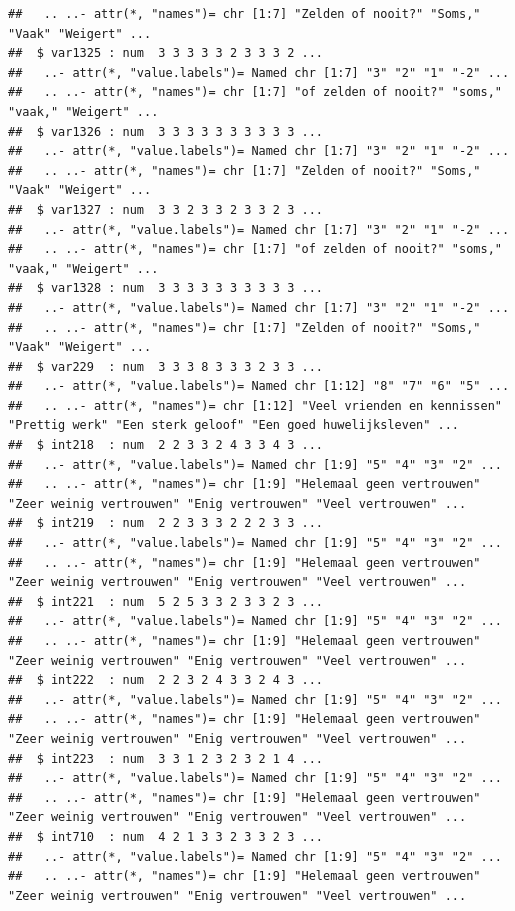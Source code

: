 \documentclass[
]{book}
\begin{document}
\begin{verbatim}
##   .. ..- attr(*, "names")= chr [1:7] "Zelden of nooit?" "Soms," "Vaak" "Weigert" ...
##  $ var1325 : num  3 3 3 3 3 2 3 3 3 2 ...
##   ..- attr(*, "value.labels")= Named chr [1:7] "3" "2" "1" "-2" ...
##   .. ..- attr(*, "names")= chr [1:7] "of zelden of nooit?" "soms," "vaak," "Weigert" ...
##  $ var1326 : num  3 3 3 3 3 3 3 3 3 3 ...
##   ..- attr(*, "value.labels")= Named chr [1:7] "3" "2" "1" "-2" ...
##   .. ..- attr(*, "names")= chr [1:7] "Zelden of nooit?" "Soms," "Vaak" "Weigert" ...
##  $ var1327 : num  3 3 2 3 3 2 3 3 2 3 ...
##   ..- attr(*, "value.labels")= Named chr [1:7] "3" "2" "1" "-2" ...
##   .. ..- attr(*, "names")= chr [1:7] "of zelden of nooit?" "soms," "vaak," "Weigert" ...
##  $ var1328 : num  3 3 3 3 3 3 3 3 3 3 ...
##   ..- attr(*, "value.labels")= Named chr [1:7] "3" "2" "1" "-2" ...
##   .. ..- attr(*, "names")= chr [1:7] "Zelden of nooit?" "Soms," "Vaak" "Weigert" ...
##  $ var229  : num  3 3 3 8 3 3 3 2 3 3 ...
##   ..- attr(*, "value.labels")= Named chr [1:12] "8" "7" "6" "5" ...
##   .. ..- attr(*, "names")= chr [1:12] "Veel vrienden en kennissen" "Prettig werk" "Een sterk geloof" "Een goed huwelijksleven" ...
##  $ int218  : num  2 2 3 3 2 4 3 3 4 3 ...
##   ..- attr(*, "value.labels")= Named chr [1:9] "5" "4" "3" "2" ...
##   .. ..- attr(*, "names")= chr [1:9] "Helemaal geen vertrouwen" "Zeer weinig vertrouwen" "Enig vertrouwen" "Veel vertrouwen" ...
##  $ int219  : num  2 2 3 3 3 2 2 2 3 3 ...
##   ..- attr(*, "value.labels")= Named chr [1:9] "5" "4" "3" "2" ...
##   .. ..- attr(*, "names")= chr [1:9] "Helemaal geen vertrouwen" "Zeer weinig vertrouwen" "Enig vertrouwen" "Veel vertrouwen" ...
##  $ int221  : num  5 2 5 3 3 2 3 3 2 3 ...
##   ..- attr(*, "value.labels")= Named chr [1:9] "5" "4" "3" "2" ...
##   .. ..- attr(*, "names")= chr [1:9] "Helemaal geen vertrouwen" "Zeer weinig vertrouwen" "Enig vertrouwen" "Veel vertrouwen" ...
##  $ int222  : num  2 2 3 2 4 3 3 2 4 3 ...
##   ..- attr(*, "value.labels")= Named chr [1:9] "5" "4" "3" "2" ...
##   .. ..- attr(*, "names")= chr [1:9] "Helemaal geen vertrouwen" "Zeer weinig vertrouwen" "Enig vertrouwen" "Veel vertrouwen" ...
##  $ int223  : num  3 3 1 2 3 2 3 2 1 4 ...
##   ..- attr(*, "value.labels")= Named chr [1:9] "5" "4" "3" "2" ...
##   .. ..- attr(*, "names")= chr [1:9] "Helemaal geen vertrouwen" "Zeer weinig vertrouwen" "Enig vertrouwen" "Veel vertrouwen" ...
##  $ int710  : num  4 2 1 3 3 2 3 3 2 3 ...
##   ..- attr(*, "value.labels")= Named chr [1:9] "5" "4" "3" "2" ...
##   .. ..- attr(*, "names")= chr [1:9] "Helemaal geen vertrouwen" "Zeer weinig vertrouwen" "Enig vertrouwen" "Veel vertrouwen" ...

\end{verbatim}
\end{document}
